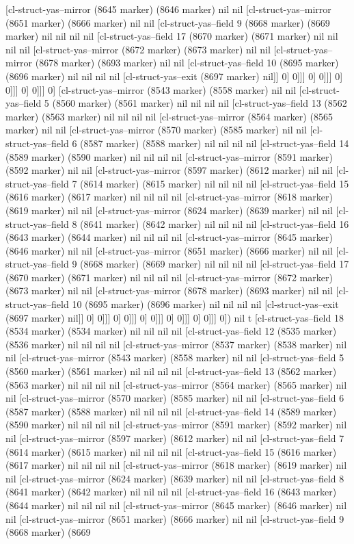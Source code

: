 {{[cl-struct-yas--mirror (8645 marker) (8646 marker) nil nil [cl-struct-yas--mirror (8651 marker) (8666 marker) nil nil [cl-struct-yas--field 9 (8668 marker) (8669 marker) nil nil nil nil [cl-struct-yas--field 17 (8670 marker) (8671 marker) nil nil nil nil [cl-struct-yas--mirror (8672 marker) (8673 marker) nil nil [cl-struct-yas--mirror (8678 marker) (8693 marker) nil nil [cl-struct-yas--field 10 (8695 marker) (8696 marker) nil nil nil nil [cl-struct-yas--exit (8697 marker) nil]] 0] 0]]] 0] 0]]] 0] 0]]] 0] 0]]] 0] [cl-struct-yas--mirror (8543 marker) (8558 marker) nil nil [cl-struct-yas--field 5 (8560 marker) (8561 marker) nil nil nil nil [cl-struct-yas--field 13 (8562 marker) (8563 marker) nil nil nil nil [cl-struct-yas--mirror (8564 marker) (8565 marker) nil nil [cl-struct-yas--mirror (8570 marker) (8585 marker) nil nil [cl-struct-yas--field 6 (8587 marker) (8588 marker) nil nil nil nil [cl-struct-yas--field 14 (8589 marker) (8590 marker) nil nil nil nil [cl-struct-yas--mirror (8591 marker) (8592 marker) nil nil [cl-struct-yas--mirror (8597 marker) (8612 marker) nil nil [cl-struct-yas--field 7 (8614 marker) (8615 marker) nil nil nil nil [cl-struct-yas--field 15 (8616 marker) (8617 marker) nil nil nil nil [cl-struct-yas--mirror (8618 marker) (8619 marker) nil nil [cl-struct-yas--mirror (8624 marker) (8639 marker) nil nil [cl-struct-yas--field 8 (8641 marker) (8642 marker) nil nil nil nil [cl-struct-yas--field 16 (8643 marker) (8644 marker) nil nil nil nil [cl-struct-yas--mirror (8645 marker) (8646 marker) nil nil [cl-struct-yas--mirror (8651 marker) (8666 marker) nil nil [cl-struct-yas--field 9 (8668 marker) (8669 marker) nil nil nil nil [cl-struct-yas--field 17 (8670 marker) (8671 marker) nil nil nil nil [cl-struct-yas--mirror (8672 marker) (8673 marker) nil nil [cl-struct-yas--mirror (8678 marker) (8693 marker) nil nil [cl-struct-yas--field 10 (8695 marker) (8696 marker) nil nil nil nil [cl-struct-yas--exit (8697 marker) nil]] 0] 0]]] 0] 0]]] 0] 0]]] 0] 0]]] 0] 0]]] 0]) nil t [cl-struct-yas--field 18 (8534 marker) (8534 marker) nil nil nil nil [cl-struct-yas--field 12 (8535 marker) (8536 marker) nil nil nil nil [cl-struct-yas--mirror (8537 marker) (8538 marker) nil nil [cl-struct-yas--mirror (8543 marker) (8558 marker) nil nil [cl-struct-yas--field 5 (8560 marker) (8561 marker) nil nil nil nil [cl-struct-yas--field 13 (8562 marker) (8563 marker) nil nil nil nil [cl-struct-yas--mirror (8564 marker) (8565 marker) nil nil [cl-struct-yas--mirror (8570 marker) (8585 marker) nil nil [cl-struct-yas--field 6 (8587 marker) (8588 marker) nil nil nil nil [cl-struct-yas--field 14 (8589 marker) (8590 marker) nil nil nil nil [cl-struct-yas--mirror (8591 marker) (8592 marker) nil nil [cl-struct-yas--mirror (8597 marker) (8612 marker) nil nil [cl-struct-yas--field 7 (8614 marker) (8615 marker) nil nil nil nil [cl-struct-yas--field 15 (8616 marker) (8617 marker) nil nil nil nil [cl-struct-yas--mirror (8618 marker) (8619 marker) nil nil [cl-struct-yas--mirror (8624 marker) (8639 marker) nil nil [cl-struct-yas--field 8 (8641 marker) (8642 marker) nil nil nil nil [cl-struct-yas--field 16 (8643 marker) (8644 marker) nil nil nil nil [cl-struct-yas--mirror (8645 marker) (8646 marker) nil nil [cl-struct-yas--mirror (8651 marker) (8666 marker) nil nil [cl-struct-yas--field 9 (8668 marker) (8669 }}
